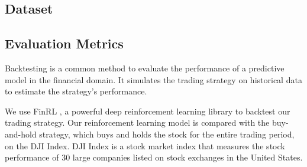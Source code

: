 \documentclass[conference]{IEEEtran}
\begin{document}
\subsection{Dataset}


\subsection{Evaluation Metrics}

Backtesting is a common method to evaluate the performance of a predictive model in the financial domain.
It simulates the trading strategy on historical data to estimate the strategy's performance.

We use FinRL \cite{liu2022finrldeepreinforcementlearning}, a powerful deep reinforcement learning library to backtest our trading strategy.
Our reinforcement learning model is compared with the buy-and-hold strategy, which buys and holds the stock for the entire trading period, on the DJI Index.
DJI Index is a stock market index that measures the stock performance of 30 large companies listed on stock exchanges in the United States.
\end{document}
